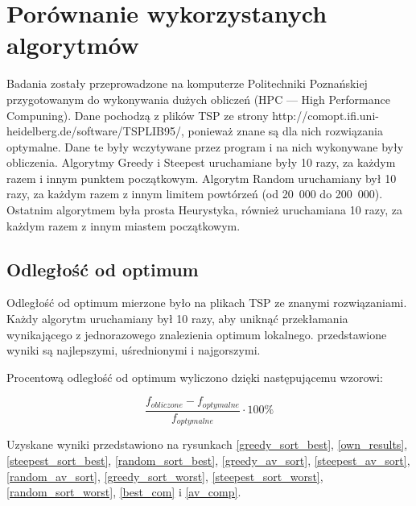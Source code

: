 \section{Porównanie wykorzystanych algorytmów}

Badania zostały przeprowadzone na komputerze Politechniki Poznańskiej przygotowanym do 
wykonywania dużych obliczeń (HPC --- High Performance Compuning). Dane pochodzą z plików
TSP ze strony http://comopt.ifi.uni-heidelberg.de/software/TSPLIB95/, ponieważ znane są dla
nich rozwiązania optymalne. Dane te były wczytywane przez program i na nich wykonywane były 
obliczenia. Algorytmy Greedy i Steepest uruchamiane były 10 razy, za każdym razem i innym 
punktem początkowym. Algorytm Random uruchamiany był 10 razy, za każdym razem z innym 
limitem powtórzeń (od 20~000 do 200~000). Ostatnim algorytmem była prosta Heurystyka, również uruchamiana 10 razy, za każdym razem z innym miastem początkowym.

\subsection{Odległość od optimum}

Odległość od optimum mierzone było na plikach TSP ze znanymi rozwiązaniami. Każdy algorytm 
uruchamiany był 10 razy, aby uniknąć przekłamania wynikającego z jednorazowego znalezienia 
optimum lokalnego. przedstawione wyniki są najlepszymi, uśrednionymi i najgorszymi.

Procentową odległość od optimum wyliczono dzięki następującemu wzorowi:

$$ \frac{f_{obliczone} - f_{optymalne}}{f_{optymalne}} \cdot 100 \% $$


Uzyskane wyniki przedstawiono na rysunkach \ref{greedy_sort_best}, \ref{own_results}, \ref{steepest_sort_best}, 
\ref{random_sort_best}, \ref{greedy_av_sort},  \ref{steepest_av_sort}, 
\ref{random_av_sort}, \ref{greedy_sort_worst},
\ref{steepest_sort_worst}, \ref{random_sort_worst}, \ref{best_com} i \ref{av_comp}. %

